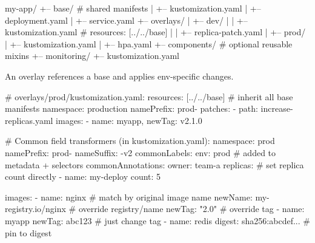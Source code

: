 \begin{tcbitemize}[
  raster columns=2, raster equal height=rows,
  blanker, cheat subtitle
]
    \begin{cheatcodebash}
    my-app/
    +-- base/                    # shared manifests
    |   +-- kustomization.yaml
    |   +-- deployment.yaml
    |   +-- service.yaml
    +-- overlays/
    |   +-- dev/
    |   |   +-- kustomization.yaml  # resources: [../../base]
    |   |   +-- replica-patch.yaml
    |   +-- prod/
    |       +-- kustomization.yaml
    |       +-- hpa.yaml
    +-- components/              # optional reusable mixins
        +-- monitoring/
            +-- kustomization.yaml
    \end{cheatcodebash}

    {\fontsize{6.5}{7.5}\selectfont\sffamily
    An overlay references a base and applies env-specific changes.}
    \begin{cheatcodebash}
    # overlays/prod/kustomization.yaml:
    resources: [../../base]   # inherit all base manifests
    namespace: production
    namePrefix: prod-
    patches:
    - path: increase-replicas.yaml
    images:
    - {name: myapp, newTag: v2.1.0}
    \end{cheatcodebash}

  \tcbitem
    \begin{cheatcodebash}
    # Common field transformers (in kustomization.yaml):
    namespace: prod
    namePrefix: prod-
    nameSuffix: -v2
    commonLabels:
      env: prod              # added to metadata + selectors
    commonAnnotations:
      owner: team-a
    replicas:                # set replica count directly
    - name: my-deploy
      count: 5
    \end{cheatcodebash}
    \begin{cheatcodebash}
    images:
    - name: nginx            # match by original image name
      newName: my-registry.io/nginx  # override registry/name
      newTag: "2.0"          # override tag
    - name: myapp
      newTag: abc123          # just change tag
    - name: redis
      digest: sha256:abcdef...  # pin to digest
    \end{cheatcodebash}


\end{tcbitemize}

